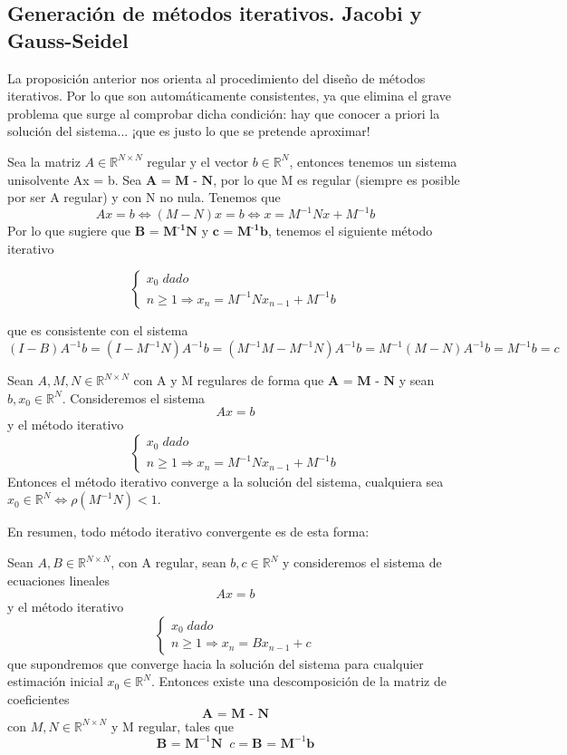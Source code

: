 \subsection{Generación de métodos iterativos. Jacobi y Gauss-Seidel}
La proposición anterior nos orienta al procedimiento del diseño de métodos iterativos. Por lo que son automáticamente consistentes, ya que elimina el grave problema que surge al comprobar dicha condición: hay que conocer a priori la solución del sistema... ¡que es justo lo que se pretende aproximar!

Sea la matriz $A \in \mathbb{R}^{N \times N}$ regular y el vector $b \in \mathbb{R}^N$, entonces tenemos un sistema unisolvente Ax = b. Sea $\textbf{A =  M - N}$, por lo que M es regular (siempre es posible por ser A regular) y  con N no nula. Tenemos que
\[ Ax = b \Leftrightarrow (M-N)x = b \Leftrightarrow x = M^{-1}Nx + M^{-1}b \]
Por lo que sugiere que $\textbf{B = M} ^{ \textbf{-1} } \textbf{N}$ y $\textbf{c = M} ^{\textbf{-1} } \textbf{b}$, tenemos el siguiente método iterativo

\[ \left\{ \begin{array}{c}
x_0 \; dado \\
n \geq 1 \Rightarrow x_n = M^{-1}Nx_{n-1} + M^{-1}b
\end{array}
\right. \]

que es consistente con el sistema
\[ (I-B)A^{-1}b = (I-M^{-1}N)A^{-1}b = (M^{-1}M-M^{-1}N)A^{-1}b = M^{-1}(M-N)A^{-1}b = M^{-1}b = c \]


\begin{ncor}
Sean $A, M, N \in \mathbb{R}^{N \times N}$ con A y M regulares de forma que $\textbf{A = M - N}$ y sean $b, x_0 \in \mathbb{R}^N$. Consideremos el sistema $$Ax = b$$ y el método iterativo
\[ \left\{ \begin{array}{c}
x_0 \; dado \\
n \geq 1 \Rightarrow x_n = M^{-1}Nx_{n-1} + M^{-1}b
\end{array}
\right. \]
Entonces el método iterativo converge a la solución del sistema, cualquiera sea $x_0 \in \mathbb{R}^N \Leftrightarrow \rho (M^{-1}N) < 1$.
\end{ncor}

En resumen, todo método iterativo convergente es de esta forma:

\begin{nprop}
Sean $A, B \in \mathbb{R}^{N \times N}$, con A regular, sean $b, c \in \mathbb{R}^N$ y consideremos el sistema de ecuaciones lineales $$Ax = b$$ y el método iterativo
\[ \left\{ \begin{array}{c}
x_0 \; dado \\
n \geq 1 \Rightarrow x_n = Bx_{n-1} + c
\end{array}
\right. \]
que supondremos que converge hacia la solución del sistema para cualquier estimación inicial $x_0 \in \mathbb{R}^N$. Entonces existe una descomposición de la matriz de coeficientes
\[ \textbf{A = M - N} \]
con $M, N \in \mathbb{R}^{N \times N}$ y M regular, tales que
\[ \textbf{B = M}^{-1} \textbf{N} \; \; c = \textbf{B = M}^{-1} \textbf{b} \]
\end{nprop}


